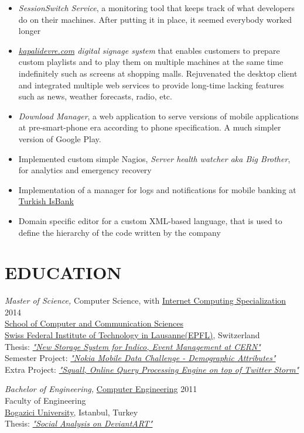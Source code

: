 \documentclass[line, margin]{res}
\begin{document}
\begin{resume}
\vspace{-0.3cm}
\begin{itemize} \itemsep -3pt
	\vspace{-.2cm}
	\item \textit{SessionSwitch Service}, a monitoring tool that keeps track of what developers do on their machines. After putting it in place, it seemed everybody worked longer
	\item \textit{\href{http://kapalidevre.com}{kapalidevre.com} digital signage system} that enables customers to prepare custom playlists and to play them on multiple machines at the same time indefinitely such as screens at shopping malls. Rejuvenated the desktop client and integrated multiple web services to provide long-time lacking features such as news, weather forecasts, radio, etc.
	\item \textit{Download Manager}, a web application to serve versions of mobile applications at pre-smart-phone era according to phone specification. A much simpler version of Google Play.
	\item Implemented custom simple Nagios, \textit{Server health watcher aka Big Brother}, for analytics and emergency recovery
	\item Implementation of a manager for logs and notifications for mobile banking at \href{http://www.isbank.com.tr/English/}{Turkish IsBank}
	\item Domain specific editor for a custom XML-based language, that is used to define the hierarchy of the code written by the company
\end{itemize}


\section{EDUCATION}
{\sl Master of Science,} Computer Science, with \href{http://ic.epfl.ch/specializations#content}{Internet Computing Specialization} \hfill{2014} \\
  \href{http://ic.epfl.ch}{School of Computer and Communication Sciences} \\
  \href{http://epfl.ch}{Swiss Federal Institute of Technology in Lausanne(EPFL)}, Switzerland \\
  Thesis: \textit{\href{http://indico-software.org/}{"New Storage System for Indico, Event Management at CERN"}} \\
  Semester Project: \textit{\href{http://research.nokia.com/page/12000}{"Nokia Mobile Data Challenge - Demographic Attributes"}} \\
  Extra Project: \textit{\href{https://github.com/epfldata/squall}{"Squall, Online Query Processing Engine on top of Twitter Storm"}}

{\sl Bachelor of Engineering,} \href{http://www.cmpe.boun.edu.tr/}{Computer Engineering} \hfill{2011} \\
  Faculty of Engineering \\
  \href{http://boun.edu.tr/en-US/Content/Default.aspx}{Bogazici University}, Istanbul, Turkey \\
  Thesis: \textit{\href{https://github.com/ferhatelmas/deviantART-analysis}{"Social Analysis on DeviantART"}}

\end{resume}
\end{document}
